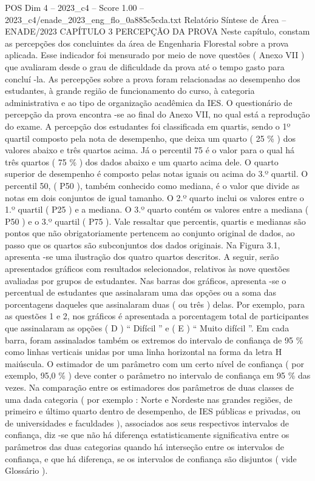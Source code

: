 \begin{textsample}{POS Dim 4 – 2023\_c4 – Score 1.00 – 2023\_c4/enade\_2023\_eng\_flo\_0a885c5cda.txt}  \label{ex:f4_pos_180}
Relatório Síntese de Área – ENADE/2023 CAPÍTULO 3 PERCEPÇÃO DA PROVA Neste capítulo, constam as percepções dos concluintes da área de Engenharia Florestal sobre a prova aplicada.
Esse indicador foi mensurado por meio de nove questões ( Anexo VII ) que avaliaram desde o grau de dificuldade da prova até o tempo gasto para concluí -la.
As percepções sobre a prova foram relacionadas ao desempenho dos estudantes, à grande região de funcionamento do curso, à categoria administrativa e ao tipo de organização acadêmica da IES.
O questionário de percepção da prova encontra -se ao final do Anexo VII, no qual está a reprodução do exame.
A percepção dos estudantes foi classificada em quartis, sendo o 1º quartil composto pela nota de desempenho, que deixa um quarto ( 25 \% ) dos valores abaixo e três quartos acima.
Já o percentil 75 é o valor para o qual há três quartos ( 75 \% ) dos dados abaixo e um quarto acima dele.
O quarto superior de desempenho é composto pelas notas iguais ou acima do 3.º quartil.
O percentil 50, ( P50 ), também conhecido como mediana, é o valor que divide as notas em dois conjuntos de igual tamanho.
O 2.º quarto inclui os valores entre o 1.º quartil ( P25 ) e a mediana.
O 3.º quarto contém os valores entre a mediana ( P50 ) e o 3.º quartil ( P75 ).
Vale ressaltar que percentis, quartis e medianas são pontos que não obrigatoriamente pertencem ao conjunto original de dados, ao passo que os quartos são subconjuntos dos dados originais.
Na Figura 3.1, apresenta -se uma ilustração dos quatro quartos descritos.
A seguir, serão apresentados gráficos com resultados selecionados, relativos às nove questões avaliadas por grupos de estudantes.
Nas barras dos gráficos, apresenta -se o percentual de estudantes que assinalaram uma das opções ou a soma das porcentagens daqueles que assinalaram duas ( ou três ) delas.
Por exemplo, para as questões 1 e 2, nos gráficos é apresentada a porcentagem total de participantes que assinalaram as opções ( D ) “ Difícil ” e ( E ) “ Muito difícil ”.
Em cada barra, foram assinalados também os extremos do intervalo de confiança de 95 \% como linhas verticais unidas por uma linha horizontal na forma da letra H maiúscula.
O estimador de um parâmetro com um certo nível de confiança ( por exemplo, 95,0 \% ) deve conter o parâmetro no intervalo de confiança em 95 \% das vezes.
Na comparação entre os estimadores dos parâmetros de duas classes de uma dada categoria ( por exemplo : Norte e Nordeste nas grandes regiões, de primeiro e último quarto dentro de desempenho, de IES públicas e privadas, ou de universidades e faculdades ), associados aos seus respectivos intervalos de confiança, diz -se que não há diferença estatisticamente significativa entre os parâmetros das duas categorias quando há interseção entre os intervalos de confiança, e que há diferença, se os intervalos de confiança são disjuntos ( vide Glossário ).

\end{textsample}
